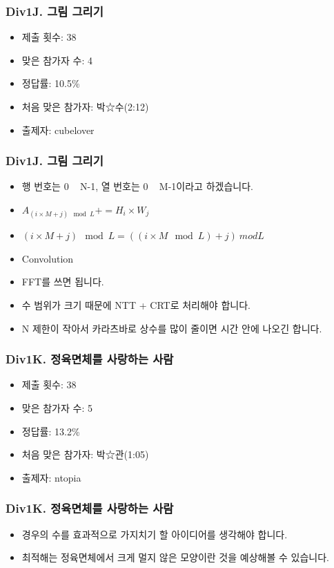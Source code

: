 \documentclass[xetex]{beamer}
\begin{document}
\begin{frame}
  \frametitle{Div1J. 그림 그리기}
  \begin{itemize}
    \item 제출 횟수: 38
    \item 맞은 참가자 수: 4
    \item 정답률: 10.5\%
    \item 처음 맞은 참가자: 박☆수(2:12)
    \item 출제자: cubelover
  \end{itemize}
\end{frame}

\begin{frame}
  \frametitle{Div1J. 그림 그리기}
  \begin{itemize}
    \item 행 번호는 0 ~ N-1, 열 번호는 0 ~ M-1이라고 하겠습니다.
    \item $A_{(i \times M + j) \mod L} += H_i \times W_j$
    \item $(i \times M + j) \mod L = ((i \times M \mod L) + j) \ mod L$
    \item Convolution
    \item FFT를 쓰면 됩니다.
    \item 수 범위가 크기 때문에 NTT + CRT로 처리해야 합니다.
    \item N 제한이 작아서 카라츠바로 상수를 많이 줄이면 시간 안에 나오긴 합니다.
  \end{itemize}
\end{frame}

\begin{frame}
  \frametitle{Div1K. 정육면체를 사랑하는 사람}
  \begin{itemize}
    \item 제출 횟수: 38
    \item 맞은 참가자 수: 5
    \item 정답률: 13.2\%
    \item 처음 맞은 참가자: 박☆관(1:05)
    \item 출제자: ntopia
  \end{itemize}
\end{frame}

\begin{frame}
  \frametitle{Div1K. 정육면체를 사랑하는 사람}
  \begin{itemize}
    \item 경우의 수를 효과적으로 가지치기 할 아이디어를 생각해야 합니다.
    \item 최적해는 정육면체에서 크게 멀지 않은 모양이란 것을 예상해볼 수 있습니다.
  \end{itemize}
\end{frame}
\end{document}

